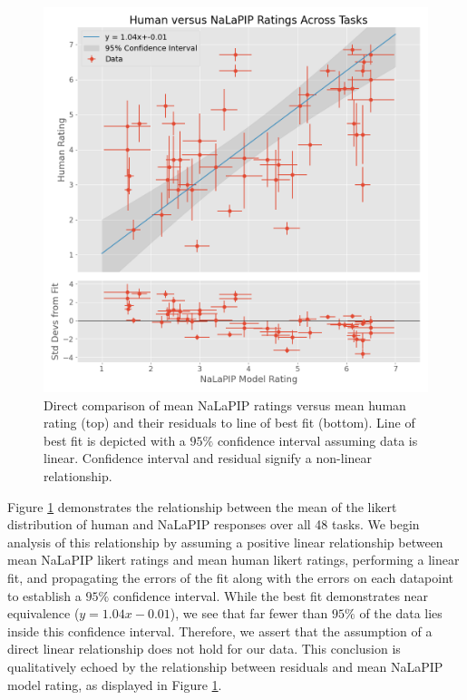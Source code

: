 \documentclass[10pt,letterpaper]{article}
\begin{document}
\begin{figure}[ht]
  \begin{center}
    \includegraphics[scale=.32]{images/NaLaPIP_human_scatter_plot_with_deviations.png}
  \end{center}
  \caption{Direct comparison of mean NaLaPIP ratings versus mean human rating (top) and their residuals to line of best fit (bottom). Line of best fit is depicted with a $95\%$ confidence interval assuming data is linear. Confidence interval and residual signify a non-linear relationship.}
  \label{fig:NaLaPIP_scatter_plot}
\end{figure}

Figure \ref{fig:NaLaPIP_scatter_plot} demonstrates the relationship between the mean of the likert distribution of human and NaLaPIP responses over all 48 tasks. We begin analysis of this relationship by assuming a positive linear relationship between mean NaLaPIP likert ratings and mean human likert ratings, performing a linear fit, and propagating the errors of the fit along with the errors on each datapoint to establish a $95\%$ confidence interval. While the best fit demonstrates near equivalence ($y=1.04x -0.01$), we see that far fewer than $95\%$ of the data lies inside this confidence interval. Therefore, we assert that the assumption of a direct linear relationship does not hold for our data. This conclusion is qualitatively echoed by the relationship between residuals and mean NaLaPIP model rating, as displayed in Figure \ref{fig:NaLaPIP_scatter_plot}. 
\end{document}
